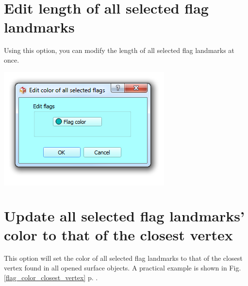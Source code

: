 \section{Edit length of all selected flag landmarks}
\noindent
\begin{minipage}{0.5\textwidth}
Using this option, you can modify the length of all selected flag landmarks at once.
\end{minipage}    
\begin{minipage}{0.5\textwidth}\centering
  \includegraphics[scale=0.5]{images/10/edit_color_all_selected_flags.png}
 \end{minipage} 




\section{Update all selected flag landmarks' color to that of the closest vertex}

This option will set the color of all selected flag landmarks to that of the closest vertex found in all opened surface objects. A practical example is shown in Fig. \ref{flag_color_closest_vertex} p. \pageref{flag_color_closest_vertex}.

